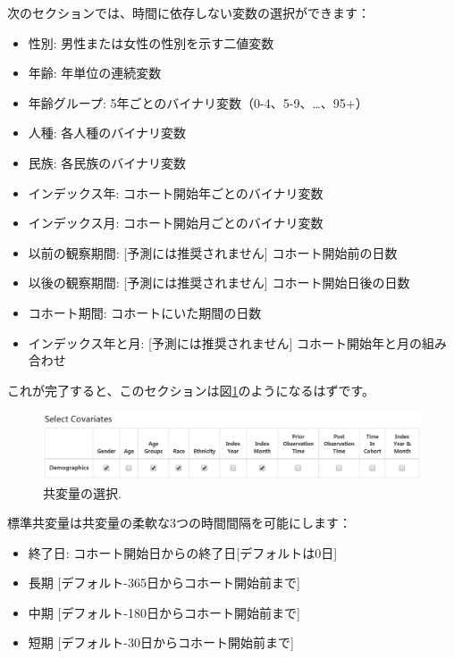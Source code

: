 \documentclass[
  11pt]{book}
\providecommand{\tightlist}{%
  \setlength{\itemsep}{0pt}\setlength{\parskip}{0pt}}
\theoremstyle{definition}
\theoremstyle{definition}
\theoremstyle{definition}
\theoremstyle{definition}
\theoremstyle{remark}
\begin{document}
次のセクションでは、時間に依存しない変数の選択ができます：

\begin{itemize}
\tightlist
\item
  性別: 男性または女性の性別を示す二値変数
\item
  年齢: 年単位の連続変数
\item
  年齢グループ: 5年ごとのバイナリ変数（0-4、5-9、\ldots、95+）
\item
  人種: 各人種のバイナリ変数
\item
  民族: 各民族のバイナリ変数
\item
  インデックス年: コホート開始年ごとのバイナリ変数
\item
  インデックス月: コホート開始月ごとのバイナリ変数
\item
  以前の観察期間: {[}予測には推奨されません{]} コホート開始前の日数
\item
  以後の観察期間: {[}予測には推奨されません{]} コホート開始日後の日数
\item
  コホート期間: コホートにいた期間の日数
\item
  インデックス年と月: {[}予測には推奨されません{]} コホート開始年と月の組み合わせ
\end{itemize}

これが完了すると、このセクションは図\ref{fig:covariateSettings2}のようになるはずです。

\begin{figure}

{\centering \includegraphics[width=1\linewidth]{images/PatientLevelPrediction/covariateSettings2} 

}

\caption{共変量の選択.}\label{fig:covariateSettings2}
\end{figure}

標準共変量は共変量の柔軟な3つの時間間隔を可能にします：

\begin{itemize}
\tightlist
\item
  終了日: コホート開始日からの終了日{[}デフォルトは0日{]}
\item
  長期 {[}デフォルト-365日からコホート開始前まで{]}
\item
  中期 {[}デフォルト-180日からコホート開始前まで{]}
\item
  短期 {[}デフォルト-30日からコホート開始前まで{]}
\end{itemize}
\end{document}
